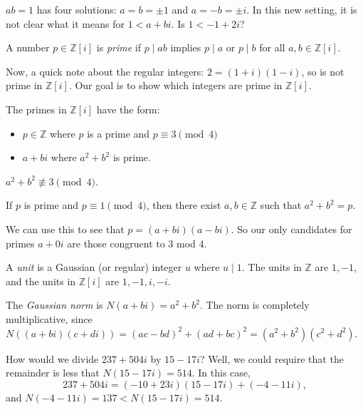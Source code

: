 \documentclass{ximera}
\begin{document}
$ab=1$ has four solutions: $a=b=\pm1$ and $a=-b=\pm i$. In this new setting, it is not clear what it means for $1<a+bi$. Is $1<-1+2i$?

\begin{definition}
 A number $p\in\mathbb{Z}[i]$ is \emph{prime} if $p\mid ab$ implies $p\mid a$ or $p\mid b$ for all $a,b\in\mathbb{Z}[i]$.
\end{definition}

Now, a quick note about the regular integers: $2=(1+i)(1-i)$, so is not prime in $\mathbb{Z}[i]$. Our goal is to show which integers are prime in $\mathbb{Z}[i]$.

\begin{theorem}
 The primes in $\mathbb{Z}[i]$ have the form:
\begin{itemize}
 \item  $p\in\mathbb{Z}$ where $p$ is a prime and $p\equiv 3 \pmod 4$
 \item $a+bi$ where $a^2+b^2$ is prime.
\end{itemize}
\end{theorem}

\begin{theorem}
 $a^2+b^2\not\equiv 3 \pmod 4$.
\end{theorem}

\begin{theorem}
 If $p$ is prime and $p\equiv 1 \pmod 4$, then there exist $a,b\in\mathbb{Z}$ such that $a^2+b^2=p$.
\end{theorem}
We can use this to see that $p=(a+bi)(a-bi)$. So our only candidates for primes $a+0i$ are those congruent to 3 mod 4.

\begin{definition}
 A \emph{unit} is a Gaussian (or regular) integer $u$ where $u\mid 1$. The units in $\mathbb{Z}$ are $1,-1$, and the units in $\mathbb{Z}[i]$ are $1,-1,i,-i$.
\end{definition}

\begin{definition}
 The \emph{Gaussian norm} is $N(a+bi)=a^2+b^2$. The norm is completely multiplicative, since $N((a+bi)(c+di))=(ac-bd)^2+(ad+bc)^2=(a^2+b^2)(c^2+d^2)$.
\end{definition}

How would we divide $237+504i$ by $15-17i$? Well, we could require that the remainder is less that $N(15-17i)=514$. In this case,
\[237+504i=(-10+23i)(15-17i)+(-4-11i),\] and $N(-4-11i)=137<N(15-17i)=514$.
\end{document}
